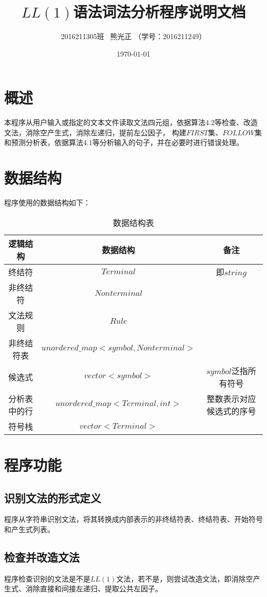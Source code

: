 \documentclass[UTF8]{ctexart}
\title{$LL(1)$语法词法分析程序说明文档}
\author{2016211305班 \ 熊光正 （学号：2016211249）}
\date{\today}
\begin{document}
\lstset{numbers=left,frame=single}
\maketitle
\tableofcontents
\clearpage
\section{概述}
本程序从用户输入或指定的文本文件读取文法四元组，依据算法$4.2$等检查、改造文法，消除空产生式，消除左递归，提前左公因子，
构建$FIRST$集、$FOLLOW$集和预测分析表，依据算法$4.1$等分析输入的句子，并在必要时进行错误处理。
\section{数据结构}
程序使用的数据结构如下：
\begin{table}[!h]
    \centering
    \caption{数据结构表}
    \begin{tabular}{|c|c|c|}
    \hline
    逻辑结构 & 数据结构 & 备注 \\ \hline
    终结符  &  $Terminal$ & 即$string$  \\ \hline
    非终结符  & $Nonterminal$  &   \\ \hline
    文法规则 & $Rule$  &   \\ \hline
    非终结符表 & $unordered\_map<symbol, Nonterminal>$  &   \\ \hline
    候选式 & $vector<symbol>$  & $symbol$泛指所有符号  \\ \hline
    分析表中的行 & $unordered\_map<Terminal, int>$  & 整数表示对应候选式的序号  \\ \hline
    符号栈 & $vector<Terminal>$  &   \\ \hline
    \end{tabular}
    \end{table}
\section{程序功能}
\subsection{识别文法的形式定义}
程序从字符串识别文法，将其转换成内部表示的非终结符表、终结符表、开始符号和产生式列表。
\subsection{检查并改造文法}
程序检查识别的文法是不是$LL(1)$文法，若不是，则尝试改造文法，即消除空产生式、消除直接和间接左递归、提取公共左因子。
\end{document}
